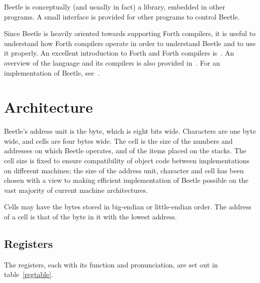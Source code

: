 \documentclass[english]{article}
\newlength{\pronunc}\pronunc=1.7in
\begin{document}
Beetle is conceptually (and usually in fact) a library, embedded in other programs.
A small interface is provided for other programs to control Beetle.

Since Beetle is heavily oriented towards supporting Forth compilers, it is
useful to understand how Forth compilers operate in order to understand Beetle
and to use it properly. An excellent introduction to Forth and Forth compilers
is~\cite{starting4th}. An overview of the language and its compilers is also
provided in~\cite{ANSIforth}. For an implementation of Beetle, see~\cite{cbeetle}.


\section{Architecture}

Beetle's address unit is the byte, which is eight bits wide. Characters are one
byte wide, and cells are four bytes wide. The cell is the size of the numbers
and addresses on which Beetle operates, and of the items placed on the stacks.
The cell size is fixed to ensure compatibility of object code between
implementations on different machines; the size of the address unit, character
and cell has been chosen with a view to making efficient implementation of
Beetle possible on the vast majority of current machine architectures.

Cells may have the bytes stored in big-endian or little-endian order. The
address of a cell is that of the byte in it with the lowest address.


\subsection{Registers}
\label{registers}

The registers, each with its function and pronunciation, are set out in table~\ref{regtable}.
\end{document}
